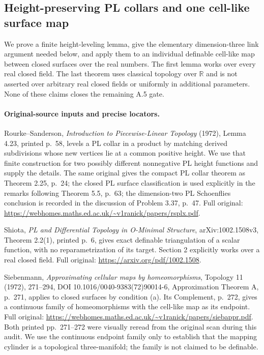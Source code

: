 \subsection*{Height-preserving PL collars and one cell-like surface map}

We prove a finite height-leveling lemma, give the elementary dimension-three
link argument needed below, and apply them to an individual definable cell-like
map between closed surfaces over the real numbers. The first lemma works over
every real closed field. The last theorem uses classical topology over
$\mathbb R$ and is not asserted over arbitrary real closed fields or uniformly
in additional parameters. None of these claims closes the remaining A.5 gate.

\paragraph{Original-source inputs and precise locators.}
Rourke--Sanderson, \emph{Introduction to Piecewise-Linear Topology} (1972),
Lemma 4.23, printed p.~58, levels a PL collar in a product by matching derived
subdivisions whose new vertices lie at a common positive height. We use that
finite construction for two possibly different nonnegative PL height functions
and supply the details. The same original gives the compact PL collar theorem
as Theorem 2.25, p.~24; the closed PL surface classification is used explicitly
in the remarks following Theorem 5.5, p.~63; the dimension-two PL Schoenflies
conclusion is recorded in the discussion of Problem 3.37, p.~47. Full original:
\url{https://webhomes.maths.ed.ac.uk/~v1ranick/papers/rsplx.pdf}.

Shiota, \emph{PL and Differential Topology in O-Minimal Structure},
arXiv:1002.1508v3, Theorem 2.2(1), printed p.~6, gives exact definable
triangulation of a scalar function, with no reparametrization of its target.
Section 2 explicitly works over a real closed field. Full original:
\url{https://arxiv.org/pdf/1002.1508}.

Siebenmann, \emph{Approximating cellular maps by homeomorphisms},
Topology 11 (1972), 271--294, DOI 10.1016/0040-9383(72)90014-6,
Approximation Theorem A, p.~271, applies to closed surfaces by condition (a).
Its Complement, p.~272, gives a continuous family of homeomorphisms with the
cell-like map as its endpoint. Full original:
\url{https://webhomes.maths.ed.ac.uk/~v1ranick/papers/siebappr.pdf}.
Both printed pp.~271--272 were visually reread from the original scan during
this audit. We use the continuous endpoint family only to establish that the
mapping cylinder is a topological three-manifold; the family is not claimed
to be definable.

